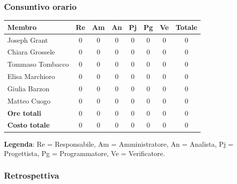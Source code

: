 \documentclass[11pt,a4paper]{article}
\begin{document}
\subsubsection{Consuntivo orario}
\begin{center}
    \begin{tabular}{|l|c|c|c|c|c|c|c|}
        \hline
        \textbf{Membro} & \textbf{Re} & \textbf{Am} & \textbf{An} & \textbf{Pj} & \textbf{Pg} & \textbf{Ve} & \textbf{Totale} \\
        \hline
        Joseph Grant & 0 & 0 & 0 & 0 & 0 & 0 & 0 \\
        \hline
        Chiara Grossele & 0 & 0 & 0 & 0 & 0 & 0 & 0\\
        \hline
        Tommaso Tombacco & 0 & 0 & 0 & 0 & 0 & 0 & 0 \\
        \hline
        Elisa Marchioro & 0 & 0 & 0 & 0 & 0 & 0 & 0 \\
        \hline
        Giulia Barzon & 0 & 0 & 0 & 0 & 0 & 0 & 0 \\
        \hline
        Matteo Cuogo & 0 & 0 & 0 & 0 & 0 & 0 & 0 \\
        \hline
        \textbf{Ore totali} & 0 & 0 & 0 & 0 & 0 & 0 & 0 \\
        \hline
        \textbf{Costo totale} & 0 & 0 & 0 & 0 & 0 & 0 & 0 \\
        \hline
    \end{tabular}
\end{center}

\noindent \textbf{Legenda}: Re = Responsabile, Am = Amministratore, An = Analista, Pj = Progettista, Pg = Programmatore, Ve = Verificatore.

\subsubsection{Retrospettiva}
\end{document}
